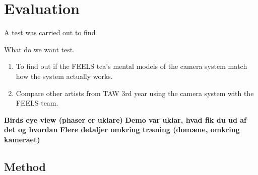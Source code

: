 \section{Evaluation}


A test was carried out to find 

What do we want test.

\begin{enumerate}
\item To find out if the FEELS tea's mental models of the camera system match how the system actually works.
\item Compare other artists from TAW 3rd year using the camera system with the FEELS team.
\end{enumerate}





\textbf{Birds eye view (phaser er uklare)}
\textbf{Demo var uklar, hvad fik du ud af det og hvordan}
\textbf{Flere detaljer omkring træning (domæne, omkring kameraet)}


\subsection{Method} \label{method}







